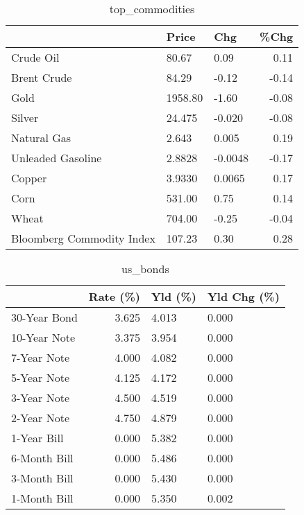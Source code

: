 \documentclass{article}%
\begin{document}
\begin{table}[htbp]%
\caption{top\_commodities}%
\centering%
\begin{adjustbox}{width=1\textwidth}%
\begin{tabular}{lllr}
\toprule
                          &   Price &     Chg &  \%Chg \\
\midrule
               Crude Oil  &   80.67 &    0.09 &  0.11 \\
             Brent Crude  &   84.29 &   -0.12 & -0.14 \\
                    Gold  & 1958.80 &   -1.60 & -0.08 \\
                  Silver  &  24.475 &  -0.020 & -0.08 \\
             Natural Gas  &   2.643 &   0.005 &  0.19 \\
       Unleaded Gasoline  &  2.8828 & -0.0048 & -0.17 \\
                  Copper  &  3.9330 &  0.0065 &  0.17 \\
                    Corn  &  531.00 &    0.75 &  0.14 \\
                   Wheat  &  704.00 &   -0.25 & -0.04 \\
Bloomberg Commodity Index &  107.23 &    0.30 &  0.28 \\
\bottomrule
\end{tabular}
%
\end{adjustbox}%
\end{table}

%


\begin{table}[htbp]%
\caption{us\_bonds}%
\centering%
\begin{adjustbox}{width=1\textwidth}%
\begin{tabular}{lrll}
\toprule
             &  Rate (\%) & Yld (\%) & Yld Chg (\%) \\
\midrule
30-Year Bond &     3.625 &   4.013 &       0.000 \\
10-Year Note &     3.375 &   3.954 &       0.000 \\
 7-Year Note &     4.000 &   4.082 &       0.000 \\
 5-Year Note &     4.125 &   4.172 &       0.000 \\
 3-Year Note &     4.500 &   4.519 &       0.000 \\
 2-Year Note &     4.750 &   4.879 &       0.000 \\
 1-Year Bill &     0.000 &   5.382 &       0.000 \\
6-Month Bill &     0.000 &   5.486 &       0.000 \\
3-Month Bill &     0.000 &   5.430 &       0.000 \\
1-Month Bill &     0.000 &   5.350 &       0.002 \\
\bottomrule
\end{tabular}
%
\end{adjustbox}%
\end{table}
\end{document}
